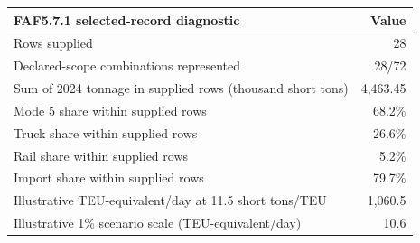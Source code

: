 \begin{tabular}{lr}
\toprule
FAF5.7.1 selected-record diagnostic & Value \\
\midrule
Rows supplied & 28 \\
Declared-scope combinations represented & 28/72 \\
Sum of 2024 tonnage in supplied rows (thousand short tons) & 4,463.45 \\
Mode 5 share within supplied rows & 68.2\% \\
Truck share within supplied rows & 26.6\% \\
Rail share within supplied rows & 5.2\% \\
Import share within supplied rows & 79.7\% \\
Illustrative TEU-equivalent/day at 11.5 short tons/TEU & 1,060.5 \\
Illustrative 1\% scenario scale (TEU-equivalent/day) & 10.6 \\
\bottomrule
\end{tabular}
